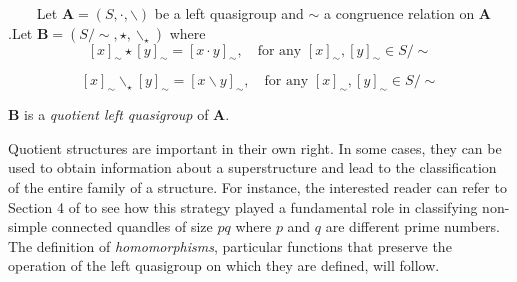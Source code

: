 \begin{definition} \cite{burris1981course}\label{quotientdef}\textcolor{white}{line}\newline\
Let $\mathbf{A}=(S,\cdot, \backslash)$ be a left quasigroup and $\sim$ a congruence relation on $\mathbf{A}$.\newline Let $\mathbf{B} = (S/\sim, \star, \backslash_\star)$ where 
\[[x]_\sim \star [y]_\sim = [x \cdot y]_\sim,\quad \text{for any }[x]_\sim,[y]_\sim \in S/\sim\]

\[[x]_\sim \backslash_\star [y]_\sim = [x \backslash y]_\sim,\quad \text{for any }[x]_\sim,[y]_\sim \in S/\sim\]

\noindent $\mathbf{B}$ is a \emph{quotient left quasigroup} of $\mathbf{A}$. 
\end{definition}

Quotient structures are important in their own right. In some cases, they can be used to obtain information about a superstructure and lead to the classification of the entire family of a structure. For instance, the interested reader can refer to Section 4 of \cite{bonatto2022connected} to see how this strategy played a fundamental role in classifying non-simple connected quandles of size $pq$ where $p$ and $q$ are different prime numbers.\newline\newline
The definition of \emph{homomorphisms}, particular functions that preserve the operation of the left quasigroup on which they are defined, will follow.
